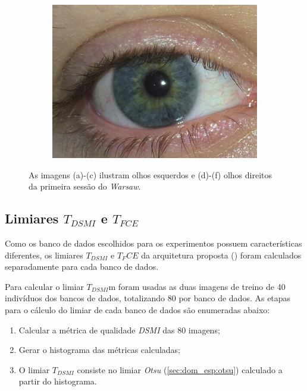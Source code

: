 \begin{figure}[H]
\begin{subfigure}{0.25\textwidth}
  \includegraphics[width=\linewidth]{img/Resultados/warsaw/right_68.jpg}
  \caption{}
\end{subfigure}
\caption{As imagens (a)-(c) ilustram olhos esquerdos e (d)-(f) olhos direitos da primeira sessão do \textit{\acrshort{Warsaw}}.}
\label{fig:experimentos:warsaw_1}
\end{figure}

\FloatBarrier

\subsection{Limiares $T_{DSMI}$ e $T_{FCE}$} \label{sec:experimentos:db:limiares}

\par Como os banco de dados escolhidos para os experimentos possuem características diferentes, os limiares $T_{DSMI}$ e $T_FCE$ da arquitetura proposta () foram calculados separadamente para cada banco de dados.

\par Para calcular o limiar $T_{DSMI}$m foram usadas as duas imagens de treino de 40 indivíduos dos bancos de dados, totalizando 80 por banco de dados. As etapas para o cálculo do limiar de cada banco de dados são enumeradas abaixo:

\begin{enumerate}
    \item Calcular a métrica de qualidade \textit{\acrshort{DSMI}} das 80 imagens;
    \item Gerar o histograma das métricas calculadas;
    \item O limiar $T_{DSMI}$ consiste no limiar \textit{Otsu} (\ref{sec:dom_esp:otsu}) calculado a partir do histograma.
\end{enumerate}

